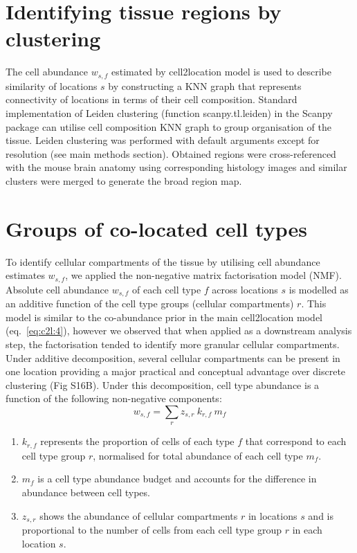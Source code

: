 \documentclass[11pt,a4paper]{article}
\begin{document}
\section{Identifying tissue regions by clustering} \label{auto_clustering}

The cell abundance $w_{s,f}$ estimated by cell2location model is used to describe similarity of locations $s$ by constructing a KNN graph that represents connectivity of locations in terms of their cell composition. Standard implementation of Leiden clustering (function scanpy.tl.leiden) in the Scanpy package \autocite{wolf_scanpy_2018} can utilise cell composition KNN graph to group organisation of the tissue. Leiden clustering was performed with default arguments except for resolution (see main methods section). Obtained regions were cross-referenced with the mouse brain anatomy using corresponding histology images and similar clusters were merged to generate the broad region map.

\section{Groups of co-located cell types} \label{cell_groups}

To identify cellular compartments of the tissue by utilising cell abundance estimates $w_{s,f}$, we applied the non-negative matrix factorisation model (NMF). Absolute cell abundance $w_{s,f}$ of each cell type $f$ across locations $s$ is modelled as an additive function of the cell type groups (cellular compartments) $r$. This model is similar to the co-abundance prior in the main cell2location model (eq.~\eqref{eq:c2l:4}), however we observed that when applied as a downstream analysis step, the factorisation tended to identify more granular cellular compartments. Under additive decomposition, several cellular compartments can be present in one location providing a major practical and conceptual advantage over discrete clustering (Fig S16B). Under this decomposition, cell type abundance is a function of the following non-negative components:  
\begin{equation} \label{eq:circ:1}
w_{s,f} = \sum_{r} {z_{s,r} \: k_{r,f} \: m_{f}}
\end{equation}

\begin{enumerate}
    \item $k_{r,f}$ represents the proportion of cells of each type $f$ that correspond to each cell type group $r$, normalised for total abundance of each cell type $m_{f}$.
    \item $m_{f}$ is a cell type abundance budget and accounts for the difference in abundance between cell types.
    \item $z_{s,r}$ shows the abundance of cellular compartments $r$ in locations $s$ and is proportional to the number of cells from each cell type group $r$ in each location $s$.
\end{enumerate}
\end{document}
